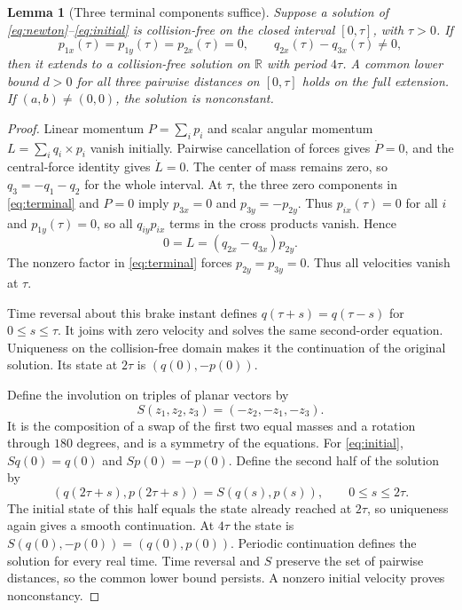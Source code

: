 \documentclass[10pt,a4paper]{article}
\newtheorem{lemma}[theorem]{Lemma}
\theoremstyle{remark}
\newcommand{\R}{\mathbb R}
\begin{document}
\begin{lemma}[Three terminal components suffice]
\label{lem:symmetry}
Suppose a solution of \eqref{eq:newton}--\eqref{eq:initial} is
collision-free on the closed interval $[0,\tau]$, with $\tau>0$. If
\begin{equation}
 p_{1x}(\tau)=p_{1y}(\tau)=p_{2x}(\tau)=0,
 \qquad q_{2x}(\tau)-q_{3x}(\tau)\ne0,
 \label{eq:terminal}
\end{equation}
then it extends to a collision-free solution on $\R$ with period
$4\tau$. A common lower bound $d>0$ for all three pairwise distances on
$[0,\tau]$ holds on the full extension. If $(a,b)\ne(0,0)$, the solution
is nonconstant.
\end{lemma}
\begin{proof}
Linear momentum $P=\sum_i p_i$ and scalar angular momentum
$L=\sum_i q_i\times p_i$ vanish initially. Pairwise cancellation of
forces gives $\dot P=0$, and the central-force identity gives $\dot L=0$.
The center of mass remains zero, so $q_3=-q_1-q_2$ for the whole
interval. At $\tau$, the three zero components in \eqref{eq:terminal}
and $P=0$ imply $p_{3x}=0$ and $p_{3y}=-p_{2y}$. Thus
$p_{ix}(\tau)=0$ for all $i$ and $p_{1y}(\tau)=0$, so all
$q_{iy}p_{ix}$ terms in the cross products vanish. Hence
\[
 0=L=(q_{2x}-q_{3x})p_{2y}.
\]
The nonzero factor in \eqref{eq:terminal} forces $p_{2y}=p_{3y}=0$.
Thus all velocities vanish at $\tau$.

Time reversal about this brake instant defines
$q(\tau+s)=q(\tau-s)$ for $0\le s\le\tau$. It joins with zero velocity
and solves the same second-order equation. Uniqueness on the
collision-free domain makes it the continuation of the original
solution. Its state at $2\tau$ is $(q(0),-p(0))$.

Define the involution on triples of planar vectors by
\[
 S(z_1,z_2,z_3)=(-z_2,-z_1,-z_3).
\]
It is the composition of a swap of the first two equal masses and a
rotation through $180$ degrees, and is a symmetry of the equations.
For \eqref{eq:initial}, $Sq(0)=q(0)$ and $Sp(0)=-p(0)$. Define the
second half of the solution by
\[
 (q(2\tau+s),p(2\tau+s))=S(q(s),p(s)),\qquad0\le s\le2\tau.
\]
The initial state of this half equals the state already reached at
$2\tau$, so uniqueness again gives a smooth continuation. At $4\tau$
the state is $S(q(0),-p(0))=(q(0),p(0))$. Periodic continuation defines
the solution for every real time. Time reversal and $S$ preserve the
set of pairwise distances, so the common lower bound persists. A
nonzero initial velocity proves nonconstancy.
\end{proof}
\end{document}
